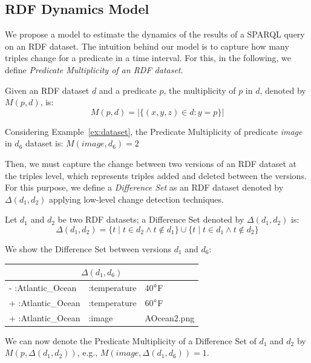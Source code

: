 \documentclass[runningheads]{llncs}
\begin{document}
\subsection{RDF Dynamics Model}

We propose a model to estimate the dynamics of the results of a SPARQL query on an RDF dataset. The intuition behind our model is to capture how many triples change for a predicate in a time interval. For this, in the following, we define \textit{Predicate Multiplicity of an RDF dataset}.

\begin{definition}
	Given an RDF dataset $d$ and a predicate $p$, the multiplicity of $p$ in $d$, denoted by $M(p,d)$, is:
	\begin{equation}
	\label{eq:pm}
	M(p,d) = |\{(x,y,z) \in d : y = p \}|
	\end{equation}
\end{definition}


\begin{example}
	\label{ex:pm}    
	Considering Example~\ref{ex:dataset}, the Predicate Multiplicity of predicate \textit{image} in $d_6$ dataset is:    $M(image,d_6) = 2$
\end{example}

Then, we must capture the change between two versions of an RDF dataset at the triples level, which represents triples added and deleted between the versions. For this purpose, we define a \textit{Difference Set} as an RDF dataset denoted by $\Delta(d_1, d_2)$ applying low-level change detection techniques.

\begin{definition}
	Let $d_1$ and $d_2$ be two RDF datasets; a Difference Set denoted by $\Delta(d_1, d_2)$ is:
	\begin{equation}
	\label{eq:ds}
	\Delta(d_1, d_2) = \{t \mid t \in d_2 \wedge t \notin d_1\} \cup \{t \mid t \in d_1 \wedge t \notin d_2\}
	\end{equation}
\end{definition}

\begin{example}
	\label{ex:ds}
	We show the Difference Set between versions $d_1$ and $d_6$:\\
	\begin{center}    
		\begin{tabular}{lll}    \hline
			\multicolumn{3}{c}{$\Delta(d_1, d_6)$} \\    \hline
			-    :Atlantic\_Ocean  & :temperature   & 40$\degree$F          \\
			+    :Atlantic\_Ocean  & :temperature   & 60$\degree$F          \\
			+    :Atlantic\_Ocean  & :image         & AOcean2.png              \\    \hline
		\end{tabular}
	\end{center}
	
	We can now denote the Predicate Multiplicity of a Difference Set of $d_1$ and $d_2$ by $M(p, \Delta(d_1, d_2))$, e.g., $M(image, \Delta(d_1, d_6)) = 1$.
\end{example}
\end{document}
